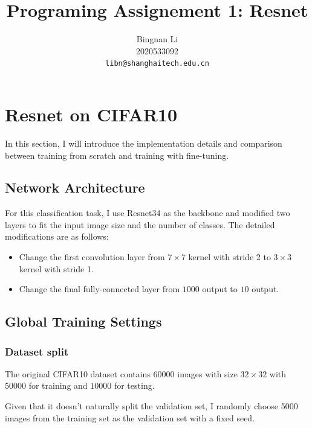 \documentclass[10pt,twocolumn,letterpaper]{article}
\begin{document}
    \title{Programing Assignement 1: Resnet}

    \author{Bingnan Li\\
    2020533092\\
    {\tt\small libn@shanghaitech.edu.cn}
    }
    \maketitle



    \section{Resnet on CIFAR10}
    \label{sec:CIFAR10}

    In this section, I will introduce the implementation details and comparison between training from scratch and training with fine-tuning.

    \subsection{Network Architecture}
    For this classification task, I use Resnet34 as the backbone and modified two layers to fit the input image size and the number of classes.
    The detailed modifications are as follows:
    \begin{itemize}
        \item Change the first convolution layer from $7\times 7$ kernel with stride 2 to $3\times 3$ kernel with stride 1.
        \item Change the final fully-connected layer from $1000$ output to $10$ output. 
    \end{itemize}

    \subsection{Global Training Settings}

    \subsubsection{Dataset split}
    \par The original CIFAR10 dataset contains 60000 images with size $32\times 32$ with 50000 for training and 10000 for testing.
    \par Given that it doesn't naturally split the validation set, I randomly choose 5000 images from the training set as the validation set with a fixed seed.
\end{document}
